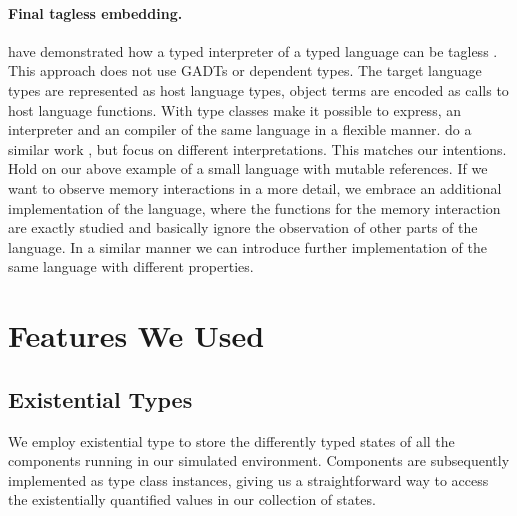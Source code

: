 %
%
%
%

\paragraph{Final tagless embedding.}
\citeauthor{final_tagless_embedding} have demonstrated how a typed interpreter of a typed language can be tagless \cite{final_tagless_embedding}. 
This approach does not use GADTs or dependent types. 
The target language types are represented as host language types, object terms are encoded as calls to host language functions. With type classes \citeauthor{final_tagless_embedding} make it possible to express, \eg an interpreter and an compiler of the same language in a flexible manner. 
\citeauthor{Hofer:2008:PED:1449913.1449935} do a similar work \cite{Hofer:2008:PED:1449913.1449935}, but focus on different interpretations.
This matches our intentions.
Hold on our above example of a small language with mutable references.
If we want to observe memory interactions in a more detail, we embrace an additional implementation of the language, where the functions for the memory interaction are exactly studied and basically ignore the observation of other parts of the language.
In a similar manner we can introduce further implementation of the same language with different properties.

\section{Features We Used}
\label{sec:impl-detail}

\subsection{Existential Types}
We employ existential type to store the differently typed states of all the components running in our simulated environment.
Components are subsequently implemented as type class instances, giving us a straightforward way to access the existentially quantified values in our collection of states.

